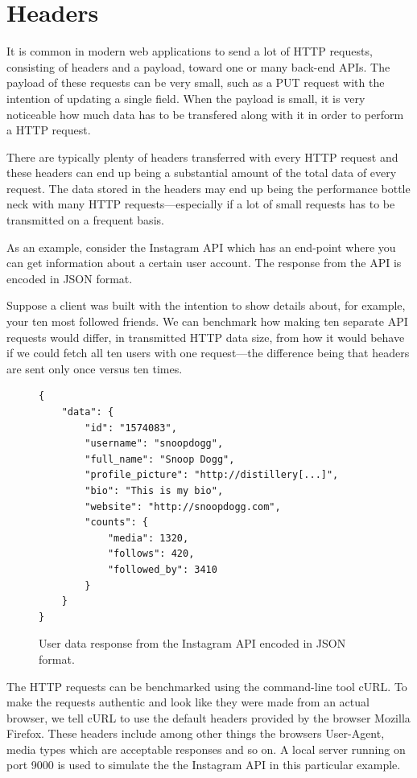 \documentclass{cslthse-msc}
\begin{document}
\section{Headers}
\label{headers}

It is common in modern web applications to send a lot of HTTP requests, consisting of headers and a payload, toward one or many back-end APIs. The payload of these requests can be very small, such as a PUT request with the intention of updating a single field. When the payload is small, it is very noticeable how much data has to be transfered along with it in order to perform a HTTP request.

There are typically plenty of headers transferred with every HTTP request and these headers can end up being a substantial amount of the total data of every request. The data stored in the headers may end up being the performance bottle neck with many HTTP requests---especially if a lot of small requests has to be transmitted on a frequent basis.

As an example, consider the Instagram API\cite{instagram_api} which has an end-point where you can get information about a certain user account. The response from the API is encoded in JSON format. 

Suppose a client was built with the intention to show details about, for example, your ten most followed friends. We can benchmark how making ten separate API requests would differ, in transmitted HTTP data size, from how it would behave if we could fetch all ten users with one request---the difference being that headers are sent only once versus ten times.

\begin{figure}[H]
  \centering
    \begin{lstlisting}
{
    "data": {
        "id": "1574083",
        "username": "snoopdogg",
        "full_name": "Snoop Dogg",
        "profile_picture": "http://distillery[...]",
        "bio": "This is my bio",
        "website": "http://snoopdogg.com",
        "counts": {
            "media": 1320,
            "follows": 420,
            "followed_by": 3410
        }
    }
}
    \end{lstlisting}
  \caption{User data response from the Instagram API encoded in JSON format.}
\end{figure}

The HTTP requests can be benchmarked using the command-line tool cURL\cite{curl}. To make the requests authentic and look like they were made from an actual browser, we tell cURL to use the default headers provided by the browser Mozilla Firefox. These headers include among other things the browsers User-Agent, media types which are acceptable responses and so on. A local server running on port 9000 is used to simulate the the Instagram API in this particular example.
\end{document}
